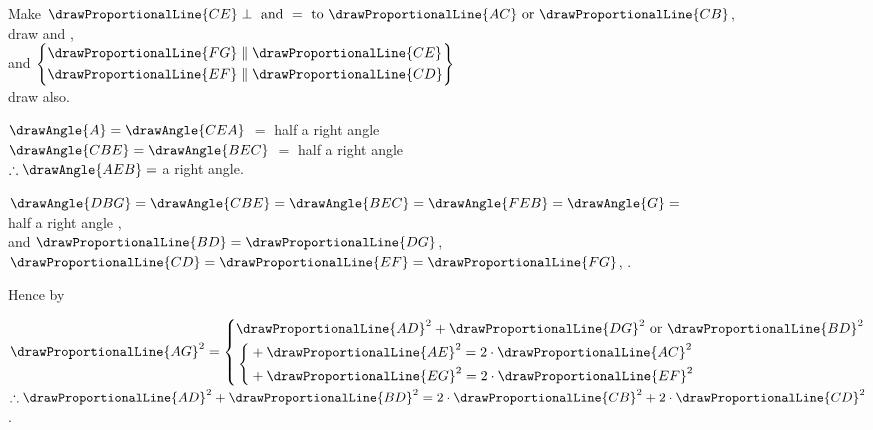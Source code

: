 \documentclass[booklanguage=english]{byrnebook}
\begin{document}
\begin{center}
Make $\drawProportionalLine{CE} \perp \mbox{ and } = \mbox{ to } \drawProportionalLine{AC} \mbox{ or } \drawProportionalLine{CB}$,\\
draw  and ,\\
and $\left\{
\begin{aligned}
\drawProportionalLine{FG} & \parallel \drawProportionalLine{CE} \\
\drawProportionalLine{EF} & \parallel \drawProportionalLine{CD}\\
\end{aligned}
\right\}$ \\
draw  also.

$\drawAngle{A} = \drawAngle{CEA}$  $=$ half a right angle \\
$\drawAngle{CBE} = \drawAngle{BEC}$  $=$ half a right angle \\
$\therefore \drawAngle{AEB} = $ a right angle.

$\drawAngle{DBG} = \drawAngle{CBE} = \drawAngle{BEC} = \drawAngle{FEB} = \drawAngle{G} =$\\
half a right angle ,\\ %
and $\drawProportionalLine{BD} = \drawProportionalLine{DG}$, $\drawProportionalLine{CD} = \drawProportionalLine{EF} = \drawProportionalLine{FG}$, .

Hence by 

$\drawProportionalLine{AG}^2 = \left\{
\begin{aligned}
& \drawProportionalLine{AD}^2 + \drawProportionalLine{DG}^2 \mbox{ or } \drawProportionalLine{BD}^2 \\
& \left\{
	\begin{aligned}
		& + \drawProportionalLine{AE}^2 = 2 \cdot \drawProportionalLine{AC}^2 \\
		& + \drawProportionalLine{EG}^2 = 2\cdot \drawProportionalLine{EF}^2 \\
	\end{aligned}
	\right. \\
\end{aligned}
\right.$\\
$\therefore \drawProportionalLine{AD}^2 + \drawProportionalLine{BD}^2 = 2 \cdot \drawProportionalLine{CB}^2 + 2 \cdot \drawProportionalLine{CD}^2$.
\end{center}
\end{document}
